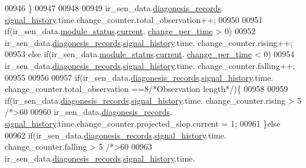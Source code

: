 \begin{DoxyCode}
00946              \}
00947 
00948 
00949                                                   ir\_sen\_data.\hyperlink{a00023_a7ae905b560513ad201e58c2f63375030}{diagonesis\_records}.
      \hyperlink{a00017_affb63906d23cb1cb7787d61eaaedfb60}{signal\_history}.time.change\_counter.total\_observation++;
00950         
00951              \textcolor{keywordflow}{if}(ir\_sen\_data.\hyperlink{a00023_a5a53c391562b059eb744ac679f3765ca}{module\_status}.\hyperlink{a00017_ab8af48cdbba92b3ae39c4470e53af944}{current}.
      \hyperlink{a00017_ad5c4f9a39d2a36632a53205ae8eb5a5d}{change\_per\_time} > 0)
00952                  ir\_sen\_data.\hyperlink{a00023_a7ae905b560513ad201e58c2f63375030}{diagonesis\_records}.\hyperlink{a00017_affb63906d23cb1cb7787d61eaaedfb60}{signal\_history}.time.
      change\_counter.rising++;
00953              \textcolor{keywordflow}{else}  \textcolor{keywordflow}{if}(ir\_sen\_data.\hyperlink{a00023_a5a53c391562b059eb744ac679f3765ca}{module\_status}.\hyperlink{a00017_ab8af48cdbba92b3ae39c4470e53af944}{current}.
      \hyperlink{a00017_ad5c4f9a39d2a36632a53205ae8eb5a5d}{change\_per\_time} < 0)
00954              ir\_sen\_data.\hyperlink{a00023_a7ae905b560513ad201e58c2f63375030}{diagonesis\_records}.\hyperlink{a00017_affb63906d23cb1cb7787d61eaaedfb60}{signal\_history}.time.
      change\_counter.falling++;
00955 
00956 
00957              \textcolor{keywordflow}{if}(ir\_sen\_data.\hyperlink{a00023_a7ae905b560513ad201e58c2f63375030}{diagonesis\_records}.\hyperlink{a00017_affb63906d23cb1cb7787d61eaaedfb60}{signal\_history}.time.
      change\_counter.total\_observation ==8\textcolor{comment}{/*Observation length*/})\{
00958 
00959              \textcolor{keywordflow}{if}(ir\_sen\_data.\hyperlink{a00023_a7ae905b560513ad201e58c2f63375030}{diagonesis\_records}.\hyperlink{a00017_affb63906d23cb1cb7787d61eaaedfb60}{signal\_history}.time.
      change\_counter.rising > 5 \textcolor{comment}{/*>60%
00960                   ir\_sen\_data.\hyperlink{a00023_a7ae905b560513ad201e58c2f63375030}{diagonesis\_records}.
      \hyperlink{a00017_affb63906d23cb1cb7787d61eaaedfb60}{signal\_history}.time.change\_counter.projected\_slop.current = 1;
00961              \}\textcolor{keywordflow}{else}
00962              \textcolor{keywordflow}{if}(ir\_sen\_data.\hyperlink{a00023_a7ae905b560513ad201e58c2f63375030}{diagonesis\_records}.\hyperlink{a00017_affb63906d23cb1cb7787d61eaaedfb60}{signal\_history}.time.
      change\_counter.falling > 5 \textcolor{comment}{/*>60%
00963               ir\_sen\_data.\hyperlink{a00023_a7ae905b560513ad201e58c2f63375030}{diagonesis\_records}.\hyperlink{a00017_affb63906d23cb1cb7787d61eaaedfb60}{signal\_history}.time.
}}
\end{DoxyCode}
